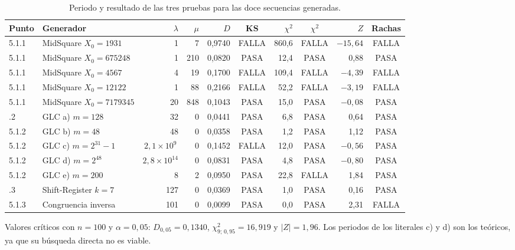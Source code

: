 \documentclass[11pt,letterpaper]{article}
\begin{document}
\begin{table}[H]
\centering
\caption{Periodo y resultado de las tres pruebas para las doce secuencias generadas.}
\label{tab:res51}
\footnotesize\setlength{\tabcolsep}{4pt}
\begin{tabular}{@{}llrrrcrcrc@{}}
\toprule
Punto & Generador & $\lambda$ & $\mu$ & $D$ & KS & $\chi^2$ & $\chi^2$ & $Z$ & Rachas \\
\midrule
5.1.1 & MidSquare $X_0=1931$    & 1 & 7   & 0,9740 & FALLA & 860,6 & FALLA & $-15{,}64$ & FALLA \\
5.1.1 & MidSquare $X_0=675248$  & 1 & 210 & 0,0820 & PASA  & 12,4  & PASA  & 0,88       & PASA  \\
5.1.1 & MidSquare $X_0=4567$    & 4 & 19  & 0,1700 & FALLA & 109,4 & FALLA & $-4{,}39$  & FALLA \\
5.1.1 & MidSquare $X_0=12122$   & 1 & 88  & 0,2166 & FALLA & 52,2  & FALLA & $-3{,}19$  & FALLA \\
5.1.1 & MidSquare $X_0=7179345$ & 20 & 848 & 0,1043 & PASA & 15,0  & PASA  & $-0{,}08$  & PASA  \\
\addlinespace
5.1.2 & GLC a) $m=128$          & 32 & 0 & 0,0441 & PASA  & 6,8  & PASA  & 0,64      & PASA \\
5.1.2 & GLC b) $m=48$           & 48 & 0 & 0,0358 & PASA  & 1,2  & PASA  & 1,12      & PASA \\
5.1.2 & GLC c) $m=2^{31}-1$     & \multicolumn{1}{c}{$2{,}1\times10^{9}$} & 0 & 0,1452 & FALLA & 12,0 & PASA & $-0{,}56$ & PASA \\
5.1.2 & GLC d) $m=2^{48}$       & \multicolumn{1}{c}{$2{,}8\times10^{14}$} & 0 & 0,0831 & PASA & 4,8 & PASA & $-0{,}80$ & PASA \\
5.1.2 & GLC e) $m=200$          & 8 & 2 & 0,0950 & PASA  & 22,8 & FALLA & 1,84      & PASA \\
\addlinespace
5.1.3 & Shift-Register $k=7$    & 127 & 0 & 0,0369 & PASA & 1,0 & PASA & 0,16 & PASA  \\
5.1.3 & Congruencia inversa     & 101 & 0 & 0,0099 & PASA & 0,0 & PASA & 2,31 & FALLA \\
\bottomrule
\end{tabular}
\begin{minipage}{\textwidth}\vspace{2pt}\footnotesize
Valores críticos con $n=100$ y $\alpha=0{,}05$: $D_{0,05}=0{,}1340$, $\chi^2_{9;\,0,95}=16{,}919$ y
$|Z|=1{,}96$. Los periodos de los literales c) y d) son los teóricos, ya que su búsqueda directa no
es viable.
\end{minipage}
\end{table}
\end{document}
